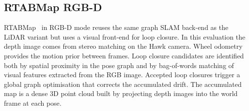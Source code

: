 %
%
%

\subsection{RTABMap RGB-D}

RTABMap~\cite{labbe2019rtabmap} in RGB-D mode reuses the same graph SLAM back-end as the LiDAR variant but
uses a visual front-end for loop closure. In this evaluation the depth image comes from stereo
matching on the Hawk camera. Wheel odometry provides the motion prior between frames. Loop
closure candidates are identified both by spatial proximity in the pose graph and by
bag-of-words matching of visual features extracted from the RGB image. Accepted loop
closures trigger a global graph optimisation that corrects the accumulated drift. The
accumulated map is a dense 3D point cloud built by projecting depth images into the world
frame at each pose.

